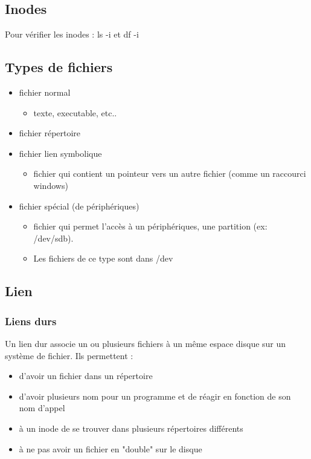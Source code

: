 \documentclass[a4paper]{article}
\begin{document}
    \subsection{Inodes}
      Pour vérifier les inodes : ls -i et df -i
    \subsection{Types de fichiers}
    \begin{itemize}[label=\textbullet, font=\Large]
      \item fichier normal
      \begin{itemize}[label=, font=\scriptsize]
        \item texte, executable, etc..
      \end{itemize}
      \item fichier répertoire
      \item fichier lien symbolique
      \begin{itemize}[label=, font=\scriptsize]
        \item fichier qui contient un pointeur vers un autre fichier (comme un raccourci windows)
      \end{itemize}
      \item fichier spécial (de périphériques)
      \begin{itemize}[label=, font=\scriptsize]
        \item fichier qui permet l'accès à un périphériques, une partition (ex: /dev/sdb).
        \item Les fichiers de ce type sont dans /dev
      \end{itemize}
    \end{itemize}

      \subsection{Lien}
      \subsubsection{Liens durs}
      Un lien dur associe un ou plusieurs fichiers à un même espace disque sur un système de fichier. Ils permettent :
      \begin{itemize}[label=\textbullet, font=\Large]
        \item d'avoir un fichier dans un répertoire
        \item d'avoir plusieurs nom pour un programme et de réagir en fonction de son nom d'appel
        \item à un inode de se trouver dans plusieurs répertoires différents
        \item à ne pas avoir un fichier en "double" sur le disque
      \end{itemize}
\end{document}
